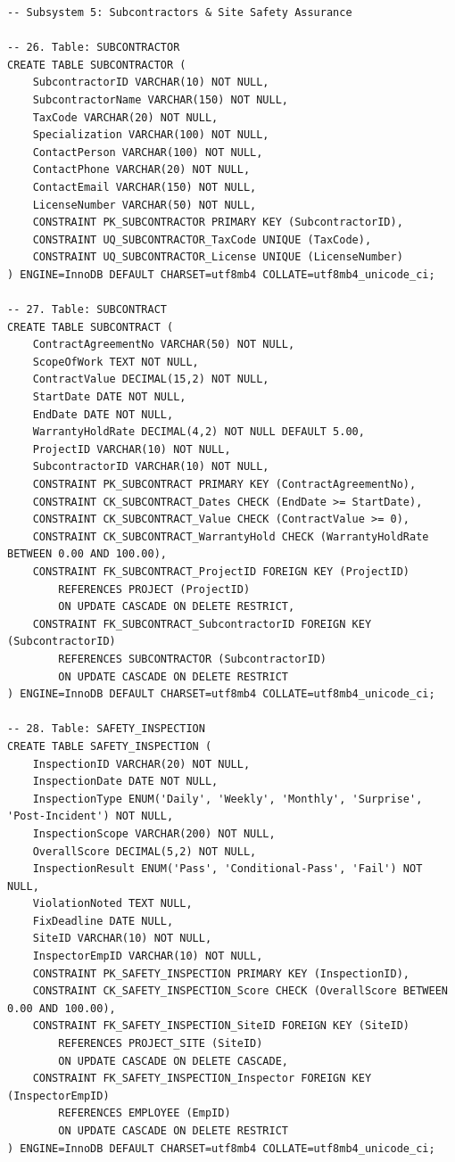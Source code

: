 \documentclass[a4paper,12pt]{report}
\begin{document}
\begin{lstlisting}
-- Subsystem 5: Subcontractors & Site Safety Assurance

-- 26. Table: SUBCONTRACTOR
CREATE TABLE SUBCONTRACTOR (
    SubcontractorID VARCHAR(10) NOT NULL,
    SubcontractorName VARCHAR(150) NOT NULL,
    TaxCode VARCHAR(20) NOT NULL,
    Specialization VARCHAR(100) NOT NULL,
    ContactPerson VARCHAR(100) NOT NULL,
    ContactPhone VARCHAR(20) NOT NULL,
    ContactEmail VARCHAR(150) NOT NULL,
    LicenseNumber VARCHAR(50) NOT NULL,
    CONSTRAINT PK_SUBCONTRACTOR PRIMARY KEY (SubcontractorID),
    CONSTRAINT UQ_SUBCONTRACTOR_TaxCode UNIQUE (TaxCode),
    CONSTRAINT UQ_SUBCONTRACTOR_License UNIQUE (LicenseNumber)
) ENGINE=InnoDB DEFAULT CHARSET=utf8mb4 COLLATE=utf8mb4_unicode_ci;

-- 27. Table: SUBCONTRACT
CREATE TABLE SUBCONTRACT (
    ContractAgreementNo VARCHAR(50) NOT NULL,
    ScopeOfWork TEXT NOT NULL,
    ContractValue DECIMAL(15,2) NOT NULL,
    StartDate DATE NOT NULL,
    EndDate DATE NOT NULL,
    WarrantyHoldRate DECIMAL(4,2) NOT NULL DEFAULT 5.00,
    ProjectID VARCHAR(10) NOT NULL,
    SubcontractorID VARCHAR(10) NOT NULL,
    CONSTRAINT PK_SUBCONTRACT PRIMARY KEY (ContractAgreementNo),
    CONSTRAINT CK_SUBCONTRACT_Dates CHECK (EndDate >= StartDate),
    CONSTRAINT CK_SUBCONTRACT_Value CHECK (ContractValue >= 0),
    CONSTRAINT CK_SUBCONTRACT_WarrantyHold CHECK (WarrantyHoldRate BETWEEN 0.00 AND 100.00),
    CONSTRAINT FK_SUBCONTRACT_ProjectID FOREIGN KEY (ProjectID)
        REFERENCES PROJECT (ProjectID)
        ON UPDATE CASCADE ON DELETE RESTRICT,
    CONSTRAINT FK_SUBCONTRACT_SubcontractorID FOREIGN KEY (SubcontractorID)
        REFERENCES SUBCONTRACTOR (SubcontractorID)
        ON UPDATE CASCADE ON DELETE RESTRICT
) ENGINE=InnoDB DEFAULT CHARSET=utf8mb4 COLLATE=utf8mb4_unicode_ci;

-- 28. Table: SAFETY_INSPECTION
CREATE TABLE SAFETY_INSPECTION (
    InspectionID VARCHAR(20) NOT NULL,
    InspectionDate DATE NOT NULL,
    InspectionType ENUM('Daily', 'Weekly', 'Monthly', 'Surprise', 'Post-Incident') NOT NULL,
    InspectionScope VARCHAR(200) NOT NULL,
    OverallScore DECIMAL(5,2) NOT NULL,
    InspectionResult ENUM('Pass', 'Conditional-Pass', 'Fail') NOT NULL,
    ViolationNoted TEXT NULL,
    FixDeadline DATE NULL,
    SiteID VARCHAR(10) NOT NULL,
    InspectorEmpID VARCHAR(10) NOT NULL,
    CONSTRAINT PK_SAFETY_INSPECTION PRIMARY KEY (InspectionID),
    CONSTRAINT CK_SAFETY_INSPECTION_Score CHECK (OverallScore BETWEEN 0.00 AND 100.00),
    CONSTRAINT FK_SAFETY_INSPECTION_SiteID FOREIGN KEY (SiteID)
        REFERENCES PROJECT_SITE (SiteID)
        ON UPDATE CASCADE ON DELETE CASCADE,
    CONSTRAINT FK_SAFETY_INSPECTION_Inspector FOREIGN KEY (InspectorEmpID)
        REFERENCES EMPLOYEE (EmpID)
        ON UPDATE CASCADE ON DELETE RESTRICT
) ENGINE=InnoDB DEFAULT CHARSET=utf8mb4 COLLATE=utf8mb4_unicode_ci;


\end{lstlisting}
\end{document}
